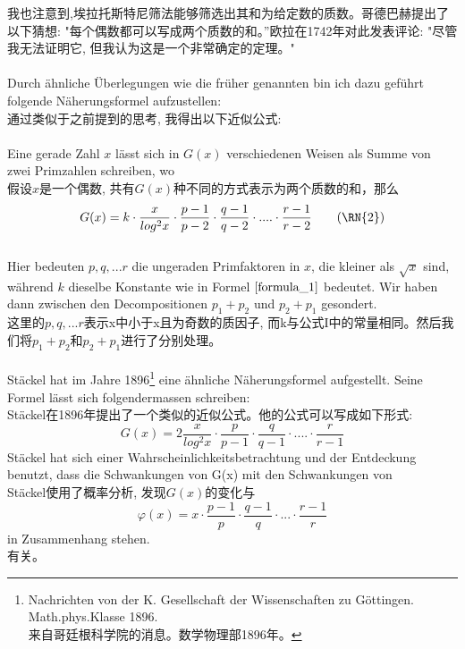 \documentclass[UTF8,a4paper,zihao=-4]{article}
\begin{document}
\indent 我也注意到,埃拉托斯特尼筛法能够筛选出其和为给定数的质数。哥德巴赫提出了以下猜想: "每个偶数都可以写成两个质数的和。”欧拉在1742年对此发表评论: "尽管我无法证明它, 但我认为这是一个非常确定的定理。"\\\\
\indent Durch ähnliche Überlegungen wie die früher genannten bin ich dazu geführt folgende Näherungsformel aufzustellen:\\
\indent 通过类似于之前提到的思考, 我得出以下近似公式:\\\\
\indent Eine gerade Zahl $x$ lässt sich in $G(x)$ verschiedenen Weisen als Summe von zwei Primzahlen schreiben, wo\\
\indent 假设$x$是一个偶数, 共有$G(x)$种不同的方式表示为两个质数的和，那么
\begin{align}\label{formula_2}
G(x)=k\cdot\frac{x}{log^2x}\cdot\frac{p-1}{p-2}\cdot\frac{q-1}{q-2}\cdot....\cdot\frac{r-1}{r-2}\tag{\RN{2}}
\end{align}\\
\indent Hier bedeuten $p, q,...r$ die ungeraden Primfaktoren in $x$, die kleiner als $\sqrt{x}$ sind, während $k$ dieselbe Konstante wie in Formel $\rm\ref{formula_1}$ bedeutet. Wir haben dann zwischen den Decompositionen $p_1+p_2$ und $p_2+p_1$ gesondert.\\
\indent 这里的$p, q,...r$表示x中小于x且为奇数的质因子, 而k与公式I中的常量相同。然后我们将$p_1+p_2$和$p_2+p_1$进行了分别处理。\\\\
\indent Stäckel hat im Jahre 1896\footnote[1]{Nachrichten von der K. Gesellschaft der Wissenschaften zu Göttingen. Math.phys.Klasse 1896.\\\indent 来自哥廷根科学院的消息。数学物理部1896年。} eine ähnliche Näherungsformel aufgestellt. Seine Formel lässt sich folgendermassen schreiben:\\
\indent Stäckel在1896年\footnotemark[1]提出了一个类似的近似公式。他的公式可以写成如下形式:
$$
G(x)=2\frac{x}{log^2x}\cdot\frac{p}{p-1}\cdot\frac{q}{q-1}\cdot....\cdot\frac{r}{r-1}
$$
\indent Stäckel hat sich einer Wahrscheinlichkeitsbetrachtung und der Entdeckung benutzt, dass die Schwankungen von G(x) mit den Schwankungen von\\
\indent Stäckel使用了概率分析, 发现$G(x)$的变化与
$$
\varphi(x)=x\cdot\frac{p-1}{p}\cdot\frac{q-1}{q}\cdot...\cdot\frac{r-1}{r}
$$
in Zusammenhang stehen.\\
有关。\\
\end{document}
